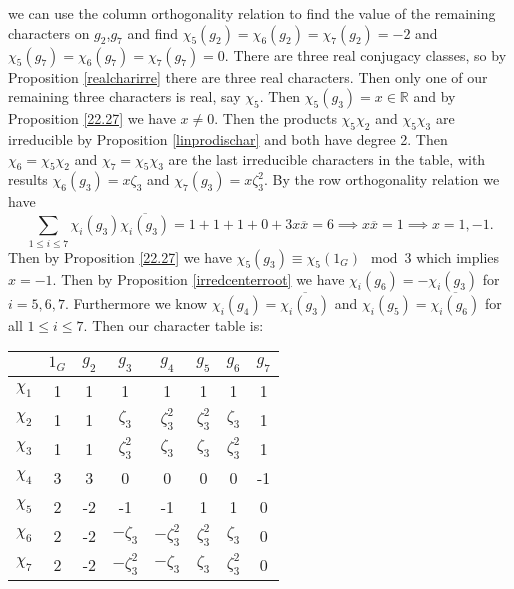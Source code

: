 \documentclass[../Project.tex]{subfiles}
\begin{document}
\begin{exam}[$\SL_2(F_3)$ {\cite[page 439]{2}}]
	we can use the column orthogonality relation to find the value of the remaining characters on $g_2$,$g_7$ and find $\chi_5(g_2) = \chi_6(g_2) = \chi_7(g_2) = -2$ and $\chi_5(g_7) = \chi_6(g_7) = \chi_7(g_7) = 0$. There are three real conjugacy classes, so by Proposition \ref{realcharirre} there are three real characters. Then only one of our remaining three characters  is real, say $\chi_5$. Then $\chi_5(g_3) = x \in \mathbb{R}$ and by Proposition \ref{22.27} we have $x \neq 0$. Then the products $\chi_5\chi_2$ and $\chi_5\chi_3$ are irreducible by Proposition \ref{linprodischar} and both have degree 2. Then $\chi_6 = \chi_5\chi_2$ and $\chi_7 = \chi_5\chi_3$ are the last irreducible characters in the table, with results $\chi_6(g_3) = x\zeta_3$ and $\chi_7(g_3) = x\zeta_3^2$. By the row orthogonality relation we have
	$$\sum_{1 \leqslant i \leqslant 7}\chi_i(g_3)\overline{\chi_i(g_3)} = 1 + 1 + 1 +0 +3x\overline{x} = 6 \implies x\overline{x} = 1 \implies x = 1,-1.$$ 
	Then by Proposition \ref{22.27} we have $\chi_5(g_3) \equiv \chi_5(1_G) \mod 3$ which implies $x = -1$. Then by Proposition \ref{irredcenterroot} we have $\chi_i(g_6) = -\chi_i(g_3)$ for $i = 5,6,7$. Furthermore we know $\chi_i(g_4) = \overline{\chi_i(g_3)}$ and $\chi_i(g_5) = \overline{\chi_i(g_6)}$ for all $1 \leqslant i \leqslant 7$. Then our character table is:\\

	\begin{minipage}{\linewidth}
	\centering
	\begin{tabular}{c | c  c  c  c c c c }
		  $ $ & $1_{G}$ & $g_2$ & $g_3$ & $g_4$ & $g_5$ & $g_6$ & $g_7$\\
	\hline
		$\chi_1$ & 1 & 1 & 1 & 1 & 1 & 1 & 1\\
		$\chi_2$ & 1 & 1 & $\zeta_3$ & $\zeta_3^2$ & $\zeta_3^2$ & $\zeta_3$ & 1\\
		$\chi_3$ & 1 & 1 & $\zeta_3^2$ & $\zeta_3$ & $\zeta_3$ & $\zeta_3^2$ & 1 \\
		$\chi_4$ & 3 & 3 & 0 & 0 & 0 & 0 & -1 \\
		$\chi_5$ & 2 & -2 & -1 & -1 & 1 & 1 & 0 \\
		$\chi_6$ & 2 & -2 & $-\zeta_3$ & $-\zeta_3^2$ & $\zeta_3^2$ & $\zeta_3$ & 0 \\
		$\chi_7$ & 2 & -2 & $-\zeta_3^2$ & $-\zeta_3$ & $\zeta_3$ & $\zeta_3^2$ & 0 \\
	\hline
	\end{tabular}
	\end{minipage}\\

\end{exam}
\end{document}
